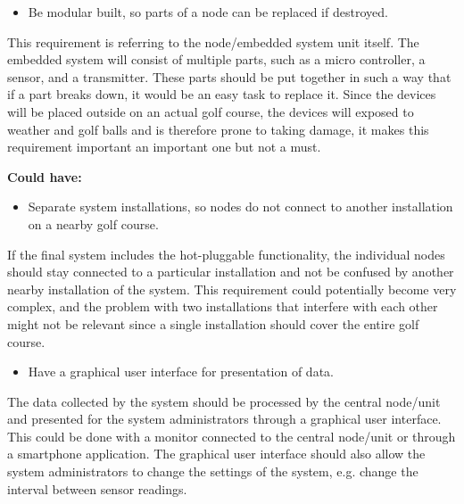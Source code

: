 \begin{itemize}
\item Be modular built, so parts of a node can be replaced if destroyed.
\end{itemize}
This requirement is referring to the node/embedded system unit itself. The embedded system will consist of multiple parts, such as a micro controller, a sensor, and a transmitter. These parts should be put together in such a way that if a part breaks down, it would be an easy task to replace it. Since the devices will be placed outside on an actual golf course, the devices will exposed to weather and golf balls and is therefore prone to taking damage, it makes this requirement important an important one but not a must.


\textbf{Could have:}
\begin{itemize}
\item Separate system installations, so nodes do not connect to another installation on a nearby golf course.
\end{itemize}
If the final system includes the hot-pluggable functionality, the individual nodes should stay connected to a particular installation and not be confused by another nearby installation of the system. This requirement could potentially become very complex, and the problem with two installations that interfere with each other might not be relevant since a single installation should cover the entire golf course.

\begin{itemize}
\item Have a graphical user interface for presentation of data.
\end{itemize}
The data collected by the system should be processed by the central node/unit and presented for the system administrators through a graphical user interface. This could be done with a monitor connected to the central node/unit or through a smartphone application. The graphical user interface should also allow the system administrators to change the settings of the system, e.g. change the interval between sensor readings.






